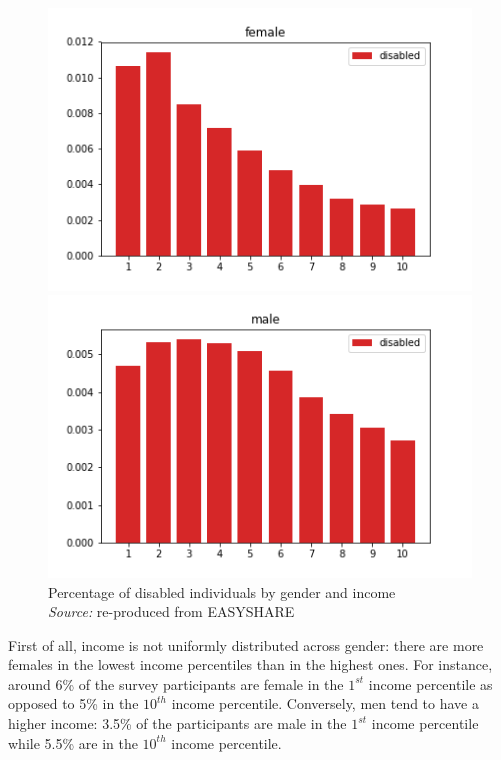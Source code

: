 \begin{figure}[H]
    \centering
    \begin{minipage}{.5\textwidth}
        \centering
        \includegraphics[scale=.5]{images/disability_only_female.png}
    \end{minipage}%
   \begin{minipage}{.5\textwidth}
        \centering
        \includegraphics[scale=.5]{images/disability_only_male.png}
    \end{minipage}
    \captionsetup{justification=centering}
    \caption{Percentage of disabled individuals by gender and income \\ \textit{Source:} re-produced from EASYSHARE}
    \label{fig:disability_True}
\end{figure}

First of all, income is not uniformly distributed across gender: there are more females in the lowest income percentiles than in the highest ones. For instance, around 6\% of the survey participants are female in the $1^{st}$ income percentile as opposed to 5\% in the $10^{th}$ income percentile. Conversely, men tend to have a higher income: 3.5\% of the participants are male in the $1^{st}$ income percentile while 5.5\% are in the $10^{th}$ income percentile. \\

